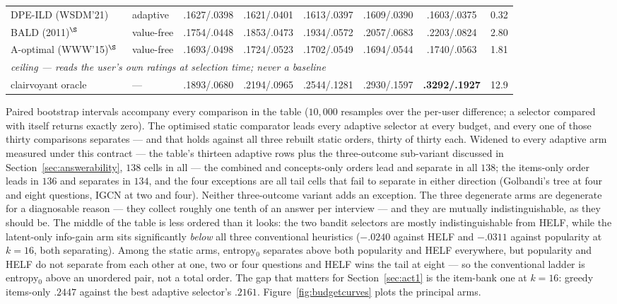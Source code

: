 \documentclass[11pt]{article}
\begin{document}
\begin{table}[t]
{\begin{tabular}{llccccc c}
DPE-ILD (WSDM'21)~\cite{parapar2021dpe} & adaptive & .1627/.0398 & .1621/.0401 & .1613/.0397 & .1609/.0390 & .1603/.0375 & 0.32 \\
BALD (2011)$^\S$~\cite{houlsby2011bald} & value-free & .1754/.0448 & .1853/.0473 & .1934/.0572 & .2057/.0683 & .2203/.0824 & 2.80 \\
A-optimal (WWW'15)$^\S$~\cite{anava2015budget,sepliarskaia2018spq} & value-free & .1693/.0498 & .1724/.0523 & .1702/.0549 & .1694/.0544 & .1740/.0563 & 1.81 \\
\midrule
\multicolumn{8}{l}{\emph{ceiling --- reads the user's own ratings at selection time; never a baseline}}\\
clairvoyant oracle & --- & .1893/.0680 & .2194/.0965 & .2544/.1281 & .2930/.1597 & \textbf{.3292/.1927} & 12.9 \\
\bottomrule
\end{tabular}}
\end{table}

Paired bootstrap intervals accompany every comparison in the table ($10{,}000$ resamples over the
per-user difference; a selector compared with itself returns exactly zero). The optimised static comparator
leads every adaptive selector at every budget, and every one of those thirty comparisons separates
--- and that holds against all three rebuilt static orders, thirty of thirty each. Widened to every
adaptive arm measured under this contract --- the table's thirteen adaptive rows plus the
three-outcome sub-variant discussed in Section~\ref{sec:answerability}, $138$ cells in all --- the
combined and concepts-only orders lead and separate in all $138$; the items-only order leads in
$136$ and separates in $134$, and the four exceptions are all tail cells that fail to separate in
either direction (Golbandi's tree at four and eight questions, IGCN at two and four). Neither
three-outcome variant adds an exception.
The three degenerate arms are degenerate for a diagnosable reason --- they collect roughly one tenth
of an answer per interview --- and they are mutually indistinguishable, as they should be. The
middle of the table is less ordered than it looks: the two bandit selectors are mostly
indistinguishable from HELF, while the latent-only info-gain arm sits significantly \emph{below}
all three conventional heuristics ($-.0240$ against HELF and $-.0311$ against popularity at
$k{=}16$, both separating). Among the static arms, entropy$_0$ separates above both popularity and
HELF everywhere, but popularity and HELF do not separate from each other at one, two or four
questions and HELF wins the tail at eight --- so the conventional ladder is entropy$_0$ above an
unordered pair, not a total order. The gap that matters for Section~\ref{sec:act1} is the item-bank one at $k{=}16$:
greedy items-only $.2447$ against the best adaptive selector's $.2161$.
Figure~\ref{fig:budgetcurves} plots the principal arms.
\end{document}
